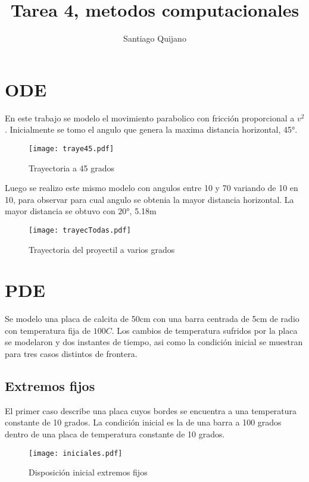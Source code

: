 \documentclass[12pt]{article}
\author{Santiago Quijano}
\title{Tarea 4, metodos computacionales}
\begin{document}
\maketitle

\section{ODE}
En este trabajo se modelo el movimiento parabolico con fricción proporcional a $v^2$. Inicialmente se tomo el angulo que genera la maxima distancia horizontal, 45°. 
\begin{figure}[h!]
\centering
\texttt{[image: traye45.pdf]}
\caption{Trayectoria a 45 grados}
\label{Fig.}
\end{figure}

Luego se realizo este mismo modelo con angulos entre 10 y 70 variando de 10 en 10, para observar para cual angulo se obtenia la mayor distancia horizontal. La mayor distancia se obtuvo con  $20°$, 5.18m

\begin{figure}[h!]
\centering
\texttt{[image: trayecTodas.pdf]}
\caption{Trayectoria del proyectil a varios grados}
\label{Fig.}
\end{figure}

\section{PDE}

Se modelo una placa de calcita de 50cm con una barra centrada de 5cm de radio con temperatura fija de $100C$. Los cambios de temperatura sufridos por la placa se modelaron y dos instantes de tiempo, asi como la condición inicial se muestran para tres casos distintos de frontera.

\subsection{Extremos fijos}

El primer caso describe una placa cuyos bordes se encuentra a una temperatura constante de 10 grados. La condición inicial es la de una barra a 100 grados dentro de una placa de temperatura constante de 10 grados.

\begin{figure}[h!]
\centering
\texttt{[image: iniciales.pdf]}
\caption{Disposición inicial extremos fijos}
\label{Fig.}
\end{figure}
\end{document}
